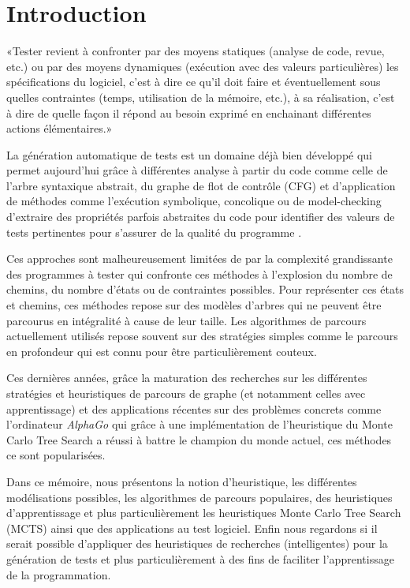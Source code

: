 \chapter*{Introduction}
«Tester revient à confronter par des moyens statiques (analyse de code, revue, etc.) ou par des moyens dynamiques (exécution avec des valeurs particulières) les spécifications du logiciel, c’est à dire ce qu’il doit faire et éventuellement sous quelles contraintes (temps, utilisation de la mémoire, etc.), à sa réalisation, c’est à dire de quelle façon il répond au besoin exprimé en enchainant différentes actions élémentaires.»\cite{jfpp-test}\cite{judea-pearl-heuristics}\cite{MCTS-methods-survey}\cite{MTCS-symbolic-execution-path-exploration}\cite{MTCS-program-synthesis}\cite{MTCS-symbolic-execution-less-path}\cite{testing-and-machine-learning}

La génération automatique de tests est un domaine déjà bien développé qui permet aujourd'hui grâce à différentes analyse à partir du code comme celle de l'arbre syntaxique abstrait, du graphe de flot de contrôle (CFG) et d'application de méthodes comme l'exécution symbolique, concolique ou de model-checking d'extraire des propriétés parfois abstraites du code pour identifier des valeurs de tests pertinentes pour s'assurer de la qualité du programme\cite{EFSM}  .

Ces approches sont malheureusement limitées de par la complexité grandissante des programmes à tester qui confronte ces méthodes à l'explosion du nombre de chemins, du nombre d'états ou de contraintes possibles. Pour représenter ces états et chemins, ces méthodes repose sur des modèles d'arbres qui ne peuvent être parcourus en intégralité à cause de leur taille. Les algorithmes de parcours actuellement utilisés repose souvent sur des stratégies simples comme le parcours en profondeur qui est connu pour être particulièrement couteux.

Ces dernières années, grâce la maturation des recherches sur les différentes stratégies et heuristiques de parcours de graphe (et notamment celles avec apprentissage) et des applications récentes sur des problèmes concrets comme l'ordinateur \textit{AlphaGo} qui grâce à une implémentation de l'heuristique du Monte Carlo Tree Search a réussi à battre le champion du monde actuel, ces méthodes ce sont popularisées.

Dans ce mémoire, nous présentons la notion d'heuristique, les différentes modélisations possibles, les algorithmes de parcours populaires, des heuristiques d'apprentissage et plus particulièrement les heuristiques Monte Carlo Tree Search (MCTS) ainsi que des applications au test logiciel. 
Enfin nous regardons si il serait possible d'appliquer des heuristiques de recherches (intelligentes) pour la génération de tests et plus particulièrement à des fins de faciliter l'apprentissage de la programmation\cite{symbolic-execution-machine-learning}.\\

